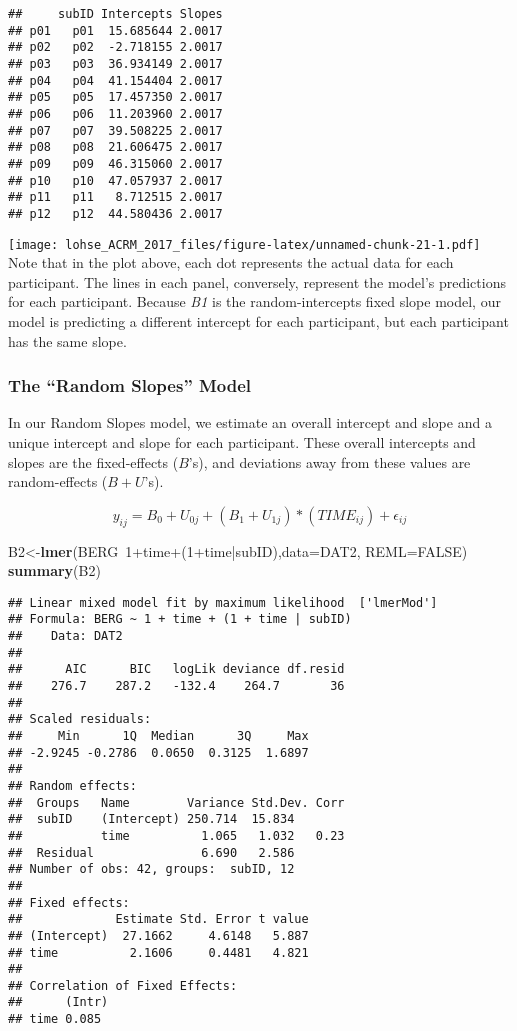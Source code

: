\documentclass[]{article}
\newenvironment{Shaded}{\begin{snugshade}}{\end{snugshade}}
\newcommand{\KeywordTok}[1]{\textcolor[rgb]{0.13,0.29,0.53}{\textbf{{#1}}}}
\newcommand{\DataTypeTok}[1]{\textcolor[rgb]{0.13,0.29,0.53}{{#1}}}
\newcommand{\DecValTok}[1]{\textcolor[rgb]{0.00,0.00,0.81}{{#1}}}
\newcommand{\OtherTok}[1]{\textcolor[rgb]{0.56,0.35,0.01}{{#1}}}
\newcommand{\NormalTok}[1]{{#1}}
\begin{document}
\begin{verbatim}
##     subID Intercepts Slopes
## p01   p01  15.685644 2.0017
## p02   p02  -2.718155 2.0017
## p03   p03  36.934149 2.0017
## p04   p04  41.154404 2.0017
## p05   p05  17.457350 2.0017
## p06   p06  11.203960 2.0017
## p07   p07  39.508225 2.0017
## p08   p08  21.606475 2.0017
## p09   p09  46.315060 2.0017
## p10   p10  47.057937 2.0017
## p11   p11   8.712515 2.0017
## p12   p12  44.580436 2.0017
\end{verbatim}

\texttt{[image: lohse\_ACRM\_2017\_files/figure-latex/unnamed-chunk-21-1.pdf]}
Note that in the plot above, each dot represents the actual data for
each participant. The lines in each panel, conversely, represent the
model's predictions for each participant. Because \emph{B1} is the
random-intercepts fixed slope model, our model is predicting a different
intercept for each participant, but each participant has the same slope.

\newpage

\subsubsection{\texorpdfstring{The ``Random Slopes''
Model}{The Random Slopes Model}}\label{the-random-slopes-model}

In our Random Slopes model, we estimate an overall intercept and slope
and a unique intercept and slope for each participant. These overall
intercepts and slopes are the fixed-effects (\(B\)'s), and deviations
away from these values are random-effects (\(B + U\)'s).

\[y_{ij} = B_0 + U_{0j} + (B_1+ U_{1j})*(TIME_{ij}) + \epsilon_{ij}\]

\begin{Shaded}
\begin{Highlighting}[]
\NormalTok{B2<-}\KeywordTok{lmer}\NormalTok{(BERG~}\DecValTok{1}\NormalTok{+time+(}\DecValTok{1}\NormalTok{+time|subID),}\DataTypeTok{data=}\NormalTok{DAT2, }\DataTypeTok{REML=}\OtherTok{FALSE}\NormalTok{)}
\KeywordTok{summary}\NormalTok{(B2)}
\end{Highlighting}
\end{Shaded}

\begin{verbatim}
## Linear mixed model fit by maximum likelihood  ['lmerMod']
## Formula: BERG ~ 1 + time + (1 + time | subID)
##    Data: DAT2
## 
##      AIC      BIC   logLik deviance df.resid 
##    276.7    287.2   -132.4    264.7       36 
## 
## Scaled residuals: 
##     Min      1Q  Median      3Q     Max 
## -2.9245 -0.2786  0.0650  0.3125  1.6897 
## 
## Random effects:
##  Groups   Name        Variance Std.Dev. Corr
##  subID    (Intercept) 250.714  15.834       
##           time          1.065   1.032   0.23
##  Residual               6.690   2.586       
## Number of obs: 42, groups:  subID, 12
## 
## Fixed effects:
##             Estimate Std. Error t value
## (Intercept)  27.1662     4.6148   5.887
## time          2.1606     0.4481   4.821
## 
## Correlation of Fixed Effects:
##      (Intr)
## time 0.085
\end{verbatim}
\end{document}

